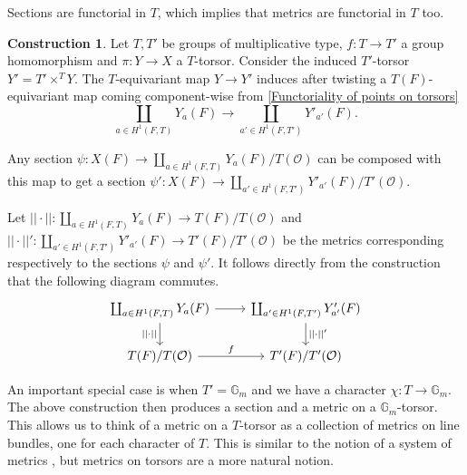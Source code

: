 \documentclass[a4paper,11pt,reqno]{amsart}
\newcommand{\G}{\mathbb{G}}
\theoremstyle{definition}
\newtheorem{construction}[theorem]{Construction}
\begin{document}
Sections are functorial in $T$, which implies that metrics are functorial in $T$ too.
\begin{construction}
	Let $T, T'$ be groups of multiplicative type, $f: T \to T'$ a group homomorphism and $\pi: Y \to X$ a $T$-torsor. Consider the induced $T'$-torsor $Y' = T' \times^T Y$. The $T$-equivariant map $Y \to Y'$ induces after twisting a $T(F)$-equivariant map coming component-wise from \eqref{Functoriality of points on torsors}
	\begin{equation*}
		\coprod_{a \in H^1(F, T)} Y_{a}(F) \to \coprod_{a' \in H^1(F, T')} Y'_{a'}(F).
	\end{equation*}
	
	Any section $\psi: X(F) \to \coprod_{a \in H^1(F, T)} Y_{a}(F)/T(\mathcal{O})$ can be composed with this map to get a section $\psi': X(F) \to \coprod_{a' \in H^1(F, T')} Y'_{a'}(F)/T'(\mathcal{O})$.
	
	Let $||\cdot||: \coprod_{a \in H^1(F, T)} Y_{a}(F) \to T(F)/T(\mathcal{O})$ and $||\cdot||': \coprod_{a' \in H^1(F, T')} Y'_{a'}(F) \to T'(F)/T'(\mathcal{O})$ be the metrics corresponding respectively to the sections $\psi$ and $\psi'$. It follows directly from the construction that the following diagram commutes.
	\begin{equation*}
		\begin{tikzcd}
			{\coprod_{a \in H^1(F, T)} Y_{a}(F)} & {\coprod_{a' \in H^1(F, T')} Y'_{a'}(F)} \\
			{T(F)/T(\mathcal{O})} & {T'(F)/T'(\mathcal{O})}
			\arrow[from=1-1, to=1-2]
			\arrow["{||\cdot||'}", from=1-2, to=2-2]
			\arrow["{||\cdot||}"', from=1-1, to=2-1]
			\arrow["f", from=2-1, to=2-2]
		\end{tikzcd}
	\end{equation*}
	\label{Functoriality of metrics and sections}
\end{construction}
An important special case is when $T' = \G_m$ and we have a character $\chi: T \to \G_m$. The above construction then produces a section and a metric on a $\G_m$-torsor. This allows us to think of a metric on a $T$-torsor as a collection of metrics on line bundles, one for each character of $T$. This is similar to the notion of a system of metrics \cite[\S4]{Peyre1998Terme}, but metrics on torsors are a more natural notion. 
\end{document}
